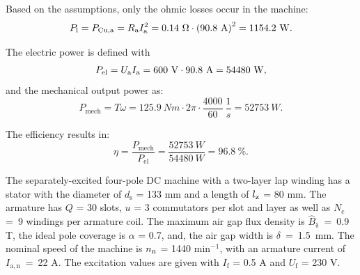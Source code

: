 \begin{solutionblock}
	Based on the assumptions, only the ohmic losses occur in the machine:
	\begin{equation}
		\Pl = \Pcu = \Ra I_{\mathrm{a}}^2
		= 0.14 \ \si{\Omega} \cdot \left(90.8 \ \si{A} \right)^2
		= 1154.2 \ \si{W}.
	\end{equation}

\end{solutionblock}


\begin{solutionblock}

	The electric power is defined with
	\begin{equation}
		P_{\mathrm{el}} = \Ua \Ia
		= 600 \ \si{V} \cdot 90.8 \ \si{A}
		= 54480 \ \si{W},
	\end{equation}
	and the mechanical output power as:
	\begin{equation}
		P_{\mathrm{mech}} = T \omega
		= 125.9 \ \si{Nm} \cdot 2 \pi \cdot \frac{4000}{60} \ \si{\frac{1}{s}}
		= 52753\ \si{W}.
	\end{equation}

	The efficiency results in:
	\begin{equation}
		\eta = \frac{P_{\mathrm{mech}}}{P_{\mathrm{el}}}
		= \frac{52753 \ \si{W}}{54480 \ \si{W}}
		= 96.8 \ \%.
	\end{equation}
\end{solutionblock}


The separately-excited four-pole DC machine with a two-layer lap winding has a stator with the diameter of $d_{\mathrm{s}}$ = 133 mm and a length of $\lz$ = 80 mm.
The armature has $Q$ = 30 slots, $u$ = 3 commutators per slot and layer as well as $N_{\mathrm{c}}~$=~9 windings per armature coil.
The maximum air gap flux density is $\hat{B}_{\updelta}$~=~0.9 T, the ideal pole coverage is $\alpha$ = 0.7, and, the air gap width is $\delta$~=~1.5~mm.
The nominal speed of the machine is $\nN$ = 1440 $\mathrm{min}^{-1}$, with an armature current of $I_{\mathrm{a,n}}$~=~22 A. The excitation values are given with $I_{\mathrm{f}}$ = 0.5 A and $U_{\mathrm{f}}$ = 230 V.

